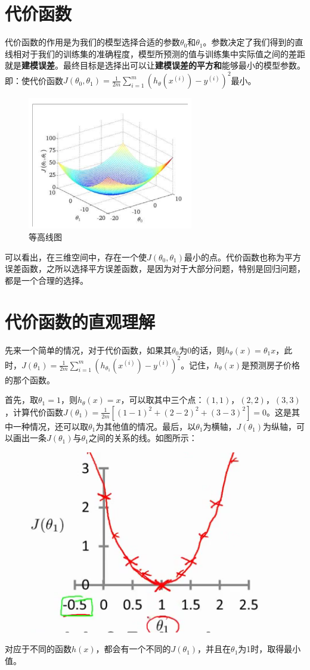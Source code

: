 \documentclass{article}
\begin{document}
\begin{large}
  \section{代价函数}
  代价函数的作用是为我们的模型选择合适的参数$\theta_0$和$\theta_1$。参数决定了我们得到的直线相对于我们的训练集的准确程度，模型所预测的值与训练集中实际值之间的差距就是\textbf{建模误差}。最终目标是选择出可以让\textbf{建模误差的平方和}能够最小的模型参数。即：使代价函数$J(\theta_0, \theta_1)=\frac{1}{2m}\sum_{i=1}^{m}(h_\theta(x^{(i)})-y^{(i)})^2$最小。

  \begin{figure}[h]
    \centering
    \includegraphics{1.PNG}
    \caption{等高线图}
  \end{figure}
  可以看出，在三维空间中，存在一个使$J(\theta_0, \theta_1)$最小的点。代价函数也称为平方误差函数，之所以选择平方误差函数，是因为对于大部分问题，特别是回归问题，都是一个合理的选择。

  \section{代价函数的直观理解}
  先来一个简单的情况，对于代价函数，如果其$\theta_0$为0的话，则$h_\theta(x)=\theta_1x$，此时，$J(\theta_1)=\frac{1}{2m}\sum_{i=1}^{m}(h_{\theta_1}(x^{(i)})-y^{(i)})^2$。记住，$h_\theta(x)$是预测房子价格的那个函数。

  首先，取$\theta_1=1$，则$h_\theta(x)=x$，可以取其中三个点：$(1,1)$，$(2,2)$，$(3,3)$，计算代价函数$J(\theta_1)=\frac{1}{2m}[(1-1)^2+(2-2)^2+(3-3)^2]=0$。这是其中一种情况，还可以取$\theta_1$为其他值的情况。最后，以$\theta_1$为横轴，$J(\theta_1)$为纵轴，可以画出一条$J(\theta_1)$与$\theta_1$之间的关系的线。如图所示：
  \begin{figure}[h]
    \centering
    \includegraphics[scale=0.7]{2.PNG}
  \end{figure}

  对应于不同的函数$h(x)$，都会有一个不同的$J(\theta_1)$，并且在$\theta_1$为1时，取得最小值。

\end{large}
\end{document}
